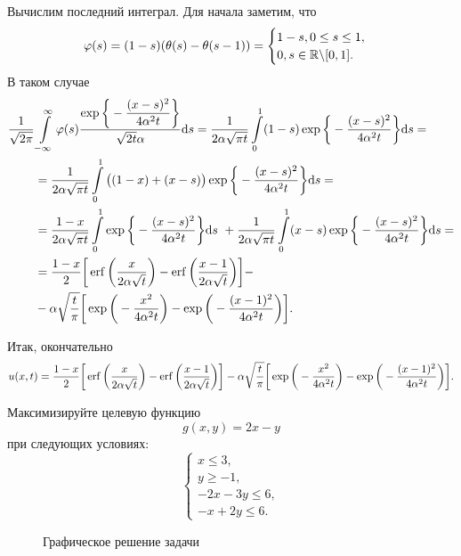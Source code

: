 Вычислим последний интеграл. Для начала заметим, что
\[
\varphi (s)=(1-s)(\theta (s)- \theta (s-1)) =
\begin{cases}
1-s, 0 \le s \le 1,\\
0, s \in \mathbb{R} \backslash [0, 1].
\end{cases}
\]
В таком случае
\begin{align*}
\dfrac{1}{\sqrt{2 \pi}} & \int \limits _{-\infty}^\infty \varphi (s) \dfrac{\exp \bigg\{ -\dfrac{(x-s)^2}{4\alpha ^2 t} \bigg\}}{\sqrt{2t} \alpha} \mathrm{d} s =
\dfrac{1}{2\alpha \sqrt{\pi t}} \int \limits _0^1 (1-s) \exp \bigg\{ -\dfrac{(x-s)^2}{4\alpha ^2 t} \bigg\} \mathrm{d} s =\\
& = \dfrac{1}{2\alpha \sqrt{\pi t}} \int \limits _0^1 \big( (1-x)+(x-s) \big) \exp \bigg\{ -\dfrac{(x-s)^2}{4\alpha ^2 t} \bigg\} \mathrm{d} s =\\
& = \dfrac{1-x}{2\alpha \sqrt{\pi t}} \int \limits _0^1 \exp \bigg\{ -\dfrac{(x-s)^2}{4\alpha ^2 t} \bigg\} \mathrm{d} s \ + \dfrac{1}{2\alpha \sqrt{\pi t}} \int \limits _0^1 (x-s) \exp \bigg\{ -\dfrac{(x-s)^2}{4\alpha ^2 t} \bigg\} \mathrm{d} s =\\
& = \dfrac{1-x}{2} \bigg[ \operatorname{erf} \bigg( \dfrac{x}{2\alpha \sqrt{t}} \bigg) - \operatorname{erf} \bigg( \dfrac{x-1}{2\alpha \sqrt{t}} \bigg) \bigg] -\\
& - \alpha \sqrt{ \dfrac{t}{\pi} } \bigg[ \exp \bigg( -\dfrac{x^2}{4\alpha ^2 t} \bigg) - \exp \bigg( -\dfrac{(x-1)^2}{4\alpha ^2 t} \bigg)  \bigg].
\end{align*}


Итак, окончательно
\[
u(x, t) = \dfrac{1-x}{2} \bigg[ \operatorname{erf} \bigg( \dfrac{x}{2\alpha \sqrt{t}} \bigg) - \operatorname{erf} \bigg( \dfrac{x-1}{2\alpha \sqrt{t}} \bigg) \bigg] -
\alpha \sqrt{ \dfrac{t}{\pi} } \bigg[ \exp \bigg( -\dfrac{x^2}{4\alpha ^2 t} \bigg) - \exp \bigg( -\dfrac{(x-1)^2}{4\alpha ^2 t} \bigg)  \bigg].
\]

 Максимизируйте целевую функцию
\[ g(x, y)=2x-y \]
при следующих условиях:
\begin{equation} \label{eq:eq7}\tag{M}
\begin{cases}
x \le 3,\\
y \ge -1,\\
-2x-3y \le 6,\\
-x+2y \le 6.
\end{cases}
\end{equation}

\begin{wrapfigure}{o}{0.6\textwidth}
\centering

\caption{Графическое решение задачи}
\label{fig:fig-3}
\end{wrapfigure}


